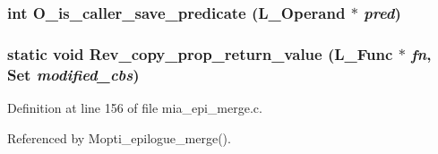 \subsubsection{\setlength{\rightskip}{0pt plus 5cm}int O\_\-is\_\-caller\_\-save\_\-predicate (L\_\-Operand $\ast$ {\em pred})}\label{mia__epi__merge_8c_e17026d5ab11147e0feec3b9488ccd79}


\subsubsection{\setlength{\rightskip}{0pt plus 5cm}static void Rev\_\-copy\_\-prop\_\-return\_\-value (L\_\-Func $\ast$ {\em fn}, Set {\em modified\_\-cbs})\hspace{0.3cm}{\tt  [static]}}\label{mia__epi__merge_8c_3cc57e3095b9a8b762547b4573634dcf}




Definition at line 156 of file mia\_\-epi\_\-merge.c.

Referenced by Mopti\_\-epilogue\_\-merge().